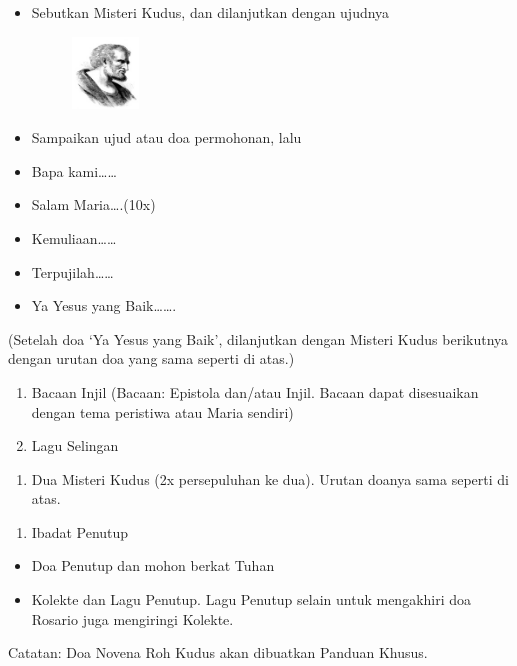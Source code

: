 \documentclass{article}
\begin{document}
\begin{itemize}
\item Sebutkan Misteri Kudus, dan dilanjutkan dengan ujudnya
\begin{figure}
\centering
\includegraphics[width=1.773cm,height=1.931cm]{BUKU20INFORMASI202013-img1.jpg}
\end{figure}
\item Sampaikan ujud atau doa permohonan, lalu 
\item Bapa kami{\dots}{\dots}
\item Salam Maria{\dots}.(10x)
\item Kemuliaan{\dots}{\dots}
\item Terpujilah{\dots}{\dots}
\item Ya Yesus yang Baik{\dots}{\dots}.
\end{itemize}
(Setelah doa {\textquoteleft}Ya Yesus yang Baik{\textquoteright},
dilanjutkan dengan Misteri Kudus berikutnya dengan urutan doa yang sama
seperti di atas.)

\begin{enumerate}
\item Bacaan Injil (Bacaan: Epistola dan/atau Injil. Bacaan dapat
disesuaikan dengan tema peristiwa atau Maria sendiri)
\item Lagu Selingan 
\end{enumerate}
\begin{enumerate}
\item Dua Misteri Kudus (2x persepuluhan ke dua). Urutan doanya sama
seperti di atas.
\end{enumerate}
\begin{enumerate}
\item Ibadat Penutup
\end{enumerate}
\begin{itemize}
\item Doa Penutup dan mohon berkat Tuhan
\item Kolekte dan Lagu Penutup. Lagu Penutup selain untuk mengakhiri doa
Rosario juga mengiringi Kolekte.
\end{itemize}
Catatan: Doa Novena Roh Kudus akan dibuatkan Panduan Khusus.
\end{document}
